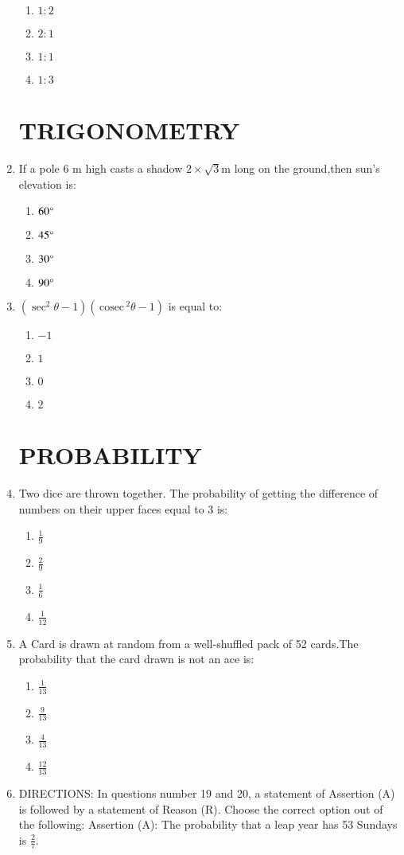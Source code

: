 \documentclass[12pt,-letter paper]{article}
\newcommand{\cosec}{\,\text{cosec}\,}
\begin{document}
\begin{enumerate}
	\begin{enumerate}
	\item $1:2$
	\item $2:1$
	\item $1:1$
	\item $1:3$
\end{enumerate}
\begin{center}
\section*{TRIGONOMETRY}
\end{center}
\item If a pole 6 m high casts a shadow $2 \times \sqrt{3}$m long on the ground,then sun's elevation is:
	\begin{enumerate}
	\item $60\degree$
	\item $45\degree$
	\item $30\degree$
	\item $90\degree$
	\end{enumerate}
 \item $ (\sec^2 \theta - 1)(\cosec^2 \theta - 1)$
is equal to:
\begin{enumerate}
	\item $-1$
	\item $1$
	\item $0$
	\item $2$
\end{enumerate}
\begin{center}
\section*{PROBABILITY}
\end{center}
\item  Two dice are thrown together. The probability of getting the difference of numbers on their upper faces equal to 3 is:

	\begin{enumerate}
	\item  $\frac{1}{9}$
	\item $\frac{2}{9}$
	\item  $\frac{1}{6}$
	\item  $\frac{1}{12}$
\end{enumerate}
\item A Card is drawn at random from a well-shuffled pack of 52 cards.The probability that the card drawn is not an ace is:
\begin{enumerate}
	\item $\frac{1}{13}$
	\item  $\frac{9}{13}$
	\item $\frac{4}{13}$
	\item $\frac{12}{13}$
\end{enumerate}
\item{DIRECTIONS:} In questions number 19 and 20, a statement of Assertion (A) is followed by a statement of Reason (R). Choose the correct option out of the following:
Assertion (A): The probability that a leap year has 53 Sundays is $\frac{2}{7}$.


\end{enumerate}
\end{document}
